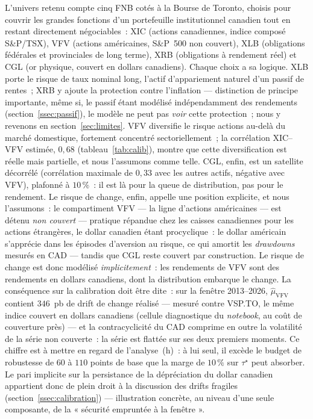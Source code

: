 \documentclass[11pt,letterpaper]{article}
\newcommand{\taustar}{\tau^{\star}}
\theoremstyle{definition}
\begin{document}
L'univers retenu compte cinq FNB cotés à la Bourse de Toronto, choisis pour
couvrir les grandes fonctions d'un portefeuille institutionnel canadien tout en
restant directement négociables~: XIC (actions canadiennes, indice composé
S\&P/TSX), VFV (actions américaines, S\&P~500 non couvert), XLB (obligations
fédérales et provinciales de long terme), XRB (obligations à rendement réel) et
CGL (or physique, couvert en dollars canadiens). Chaque choix a sa logique.
XLB porte le risque de taux nominal long, l'actif d'appariement naturel d'un
passif de rentes~; XRB y ajoute la protection contre l'inflation --- distinction
de principe importante, même si, le passif étant modélisé indépendamment des
rendements (section~\ref{ssec:passif}), le modèle ne peut pas \emph{voir} cette
protection~; nous y revenons en section~\ref{sec:limites}. VFV diversifie le
risque actions au-delà du marché domestique, fortement concentré
sectoriellement~; la corrélation XIC--VFV estimée, $0{,}68$
(tableau~\ref{tab:calib}), montre que cette diversification est réelle mais
partielle, et nous l'assumons comme telle. CGL, enfin, est un satellite
décorrélé (corrélation maximale de $0{,}33$ avec les autres actifs, négative
avec VFV), plafonné à $10\,\%$~: il est là pour la queue de distribution, pas
pour le rendement. Le risque de change, enfin, appelle une position explicite, et nous
l'assumons~: le compartiment VFV --- la ligne d'actions américaines --- est détenu \emph{non couvert} --- pratique
répandue chez les caisses canadiennes pour les actions étrangères, le dollar
canadien étant procyclique~: le dollar américain s'apprécie dans les épisodes
d'aversion au risque, ce qui amortit les \emph{drawdowns} mesurés en CAD ---
tandis que CGL reste couvert par construction. Le risque de change est donc
modélisé \emph{implicitement}~: les rendements de VFV sont des rendements en
dollars canadiens, dont la distribution embarque le change. La conséquence
sur la calibration doit être dite~: sur la fenêtre 2013--2026,
$\hat\mu_{\mathrm{VFV}}$ contient $346$~pb de drift de change réalisé ---
mesuré contre VSP.TO, le même indice couvert en dollars canadiens (cellule
diagnostique du \emph{notebook}, au coût de couverture près) --- et la
contracyclicité du CAD comprime en outre la volatilité de la série non
couverte~: la série est flattée sur ses deux premiers moments. Ce chiffre est
à mettre en regard de l'analyse~(h)~: à lui seul, il excède le budget de
robustesse de $60$ à $110$ points de base que la marge de $10\,\%$ sur
$\taustar$ peut absorber. Le pari implicite sur la persistance de la
dépréciation du dollar canadien appartient donc de plein droit à la
discussion des drifts fragiles (section~\ref{ssec:calibration}) ---
illustration concrète, au niveau d'une seule composante, de la « sécurité
empruntée à la fenêtre ».
\end{document}
